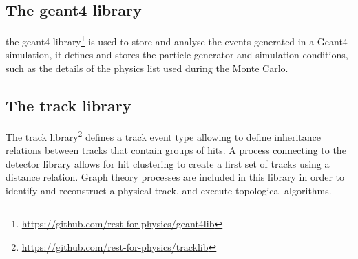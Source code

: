 \subsection{The geant4 library}
the geant4 library\footnote{\url{https://github.com/rest-for-physics/geant4lib}} is used to store and analyse the events generated in a Geant4 simulation, it defines and stores the particle generator and simulation conditions, such as the details of the physics list used during the Monte Carlo.

\subsection{The track library}

The track library\footnote{\url{https://github.com/rest-for-physics/tracklib}} defines a track event type allowing to define inheritance relations between tracks that contain groups of hits. A process connecting to the detector library allows for hit clustering to create a first set of tracks using a distance relation. Graph theory processes are included in this library in order to identify and reconstruct a physical track, and execute topological algorithms.

